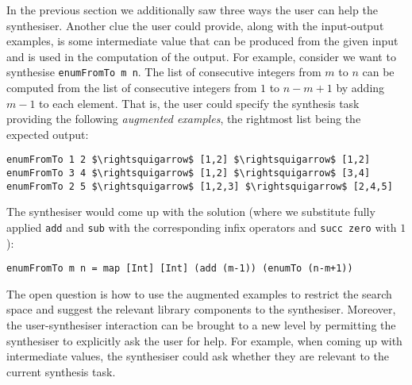 In the previous section we additionally saw three ways the user can help the synthesiser. Another clue the user could provide, along with the input-output examples, is some intermediate value that can be produced from the given input and is used in the computation of the output.
For example, consider we want to synthesise \lstinline!enumFromTo m n!. The list of consecutive integers from $m$ to $n$ can be computed from the list of consecutive integers from $1$ to $n-m+1$ by adding $m-1$ to each element. That is, the user could specify the synthesis task providing the following \emph{augmented examples}, the rightmost list being the expected output:
\begin{lstlisting}[style=plain]
enumFromTo 1 2 $\rightsquigarrow$ [1,2] $\rightsquigarrow$ [1,2]
enumFromTo 3 4 $\rightsquigarrow$ [1,2] $\rightsquigarrow$ [3,4]
enumFromTo 2 5 $\rightsquigarrow$ [1,2,3] $\rightsquigarrow$ [2,4,5]
\end{lstlisting}
The synthesiser would come up with the solution (where we substitute fully applied \lstinline!add! and \lstinline!sub! with the corresponding infix operators and \lstinline!succ zero! with $1$):
\begin{lstlisting}[style=plain]
enumFromTo m n = map [Int] [Int] (add (m-1)) (enumTo (n-m+1))
\end{lstlisting}
The open question is how to use the augmented examples to restrict the search space and suggest the relevant library components to the synthesiser. 
Moreover, the user-synthesiser interaction can be brought to a new level by permitting the synthesiser to explicitly ask the user for help. For example, when coming up with intermediate values, the synthesiser could ask whether they are relevant to the current synthesis task.



